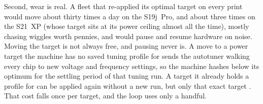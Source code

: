 Second, wear is real. A fleet that re-applied its optimal target on every print would move about thirty times a day on the S19j~Pro, and about three times on the S21~XP (whose target sits at its power ceiling almost all the time), mostly chasing wiggles worth pennies, and would pause and resume hardware on noise. %
Moving the target is not always free, and pausing never is. A move to a power target the machine has no saved tuning profile for sends the autotuner walking every chip to new voltage and frequency settings, so the machine hashes below its optimum for the settling period of that tuning run. A target it already holds a profile for can be applied again without a new run, but only that exact target \autocite{braiinsacademyautotuning,braiinsacademydps}. %
That cost falls once per target, and the loop uses only a handful.
